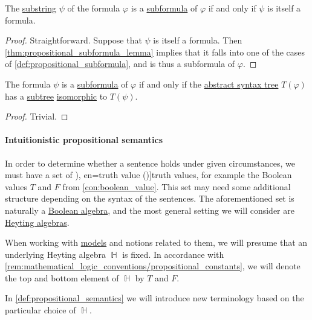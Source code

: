 \begin{proposition}\label{thm:propositional_formula_characterization}
  The \hyperref[def:formal_language/substring]{substring} \( \psi \) of the formula \( \varphi \) is a \hyperref[def:propositional_subformula]{subformula} of \( \varphi \) if and only if \( \psi \) is itself a formula.
\end{proposition}
\begin{proof}
  \SufficiencySubProof Straightforward.
  \NecessitySubProof Suppose that \( \psi \) is itself a formula. Then \cref{thm:propositional_subformula_lemma} implies that it falls into one of the cases of \cref{def:propositional_subformula}, and is thus a subformula of \( \varphi \).
\end{proof}

\begin{proposition}\label{thm:propositional_ast_subformula}
  The formula \( \psi \) is a \hyperref[def:propositional_subformula]{subformula} of \( \varphi \) if and only if the \hyperref[def:propositional_formula_ast]{abstract syntax tree} \( T(\varphi) \) has a \hyperref[def:tree/subtree]{subtree} \hyperref[def:labeled_tree/homomorphism]{isomorphic} to \( T(\psi) \).
\end{proposition}
\begin{proof}
  Trivial.
\end{proof}

\paragraph{Intuitionistic propositional semantics}

\begin{definition}\label{con:truth_value_algebra}\mimprovised
  In order to determine whether a sentence holds under given circumstances, we must have a set of \term[ru=истинностное значение (\cite[17]{Герасимов2011Вычислимость}), en=truth value (\cite[9]{Smullyan1995FOL})]{truth values}, for example the Boolean values \( T \) and \( F \) from \cref{con:boolean_value}. This set may need some additional structure depending on the syntax of the sentences. The aforementioned set is naturally a \hyperref[def:boolean_algebra]{Boolean algebra}, and the most general setting we will consider are \hyperref[def:heyting_algebra]{Heyting algebras}.

  When working with \hyperref[def:institution/models]{models} and notions related to them, we will presume that an underlying Heyting algebra \( \BbbH \) is fixed. In accordance with \cref{rem:mathematical_logic_conventions/propositional_constants}, we will denote the top and bottom element of \( \BbbH \) by \( T \) and \( F \).
\end{definition}
\begin{comments}
  \item In \cref{def:propositional_semantics} we will introduce new terminology based on the particular choice of \( \BbbH \).
\end{comments}

